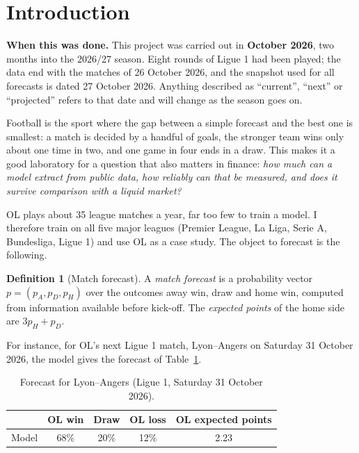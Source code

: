 \documentclass[11pt,a4paper]{article}
\theoremstyle{definition}
\newtheorem{definition}{Definition}[section]
\theoremstyle{remark}
\begin{document}
\section{Introduction}

\textbf{When this was done.} This project was carried out in \textbf{October 2026}, two months into the 2026/27 season. Eight rounds of Ligue 1 had been played; the data end with the matches of 26 October 2026,
and the snapshot used for all forecasts is dated 27 October 2026. Anything described as ``current'', ``next'' or ``projected'' refers to that date and will change as the season goes on.

Football is the sport where the gap between a simple forecast and the best one is smallest: a match is decided by a handful of goals,
the stronger team wins only about one time in two, and one game in four ends in a draw. This makes it a good laboratory for a question that also matters in finance:
\emph{how much can a model extract from public data, how reliably can that be measured, and does it survive comparison with a liquid market?}

OL plays about 35 league matches a year, far too few to train a model. I therefore train on all five major leagues (Premier League, La Liga, Serie A, Bundesliga, Ligue 1)
and use OL as a case study. The object to forecast is the following.

\begin{definition}[Match forecast]
A \emph{match forecast} is a probability vector $p=(p_A,p_D,p_H)$ over the outcomes away win, draw and home win, computed from information available before kick-off.
The \emph{expected points} of the home side are $3p_H+p_D$.
\end{definition}

For instance, for OL's next Ligue 1 match, Lyon--Angers on Saturday 31 October 2026, the model gives the forecast of Table~\ref{tab:next}.

\begin{table}[H]
\caption{Forecast for Lyon--Angers (Ligue 1, Saturday 31 October 2026).\label{tab:next}}
\begin{center}
\small
\begin{tabular}{lcccc}
\toprule
\textbf{} & \textbf{OL win} & \textbf{Draw} & \textbf{OL loss} & \textbf{OL expected points} \\
\midrule
Model & 68\% & 20\% & 12\% & 2.23 \\
\bottomrule
\end{tabular}
\end{center}
\end{table}
\end{document}

